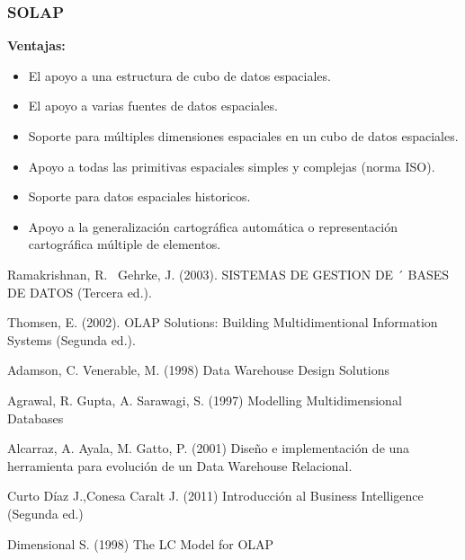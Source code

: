 \documentclass[DIV=calc, paper=a4, fontsize=11pt, twocolumn]{scrartcl}	 %
\begin{document}
\subsubsection{SOLAP}
\textbf{Ventajas:}
\begin{itemize}
\item El apoyo a una estructura de cubo de datos espaciales.
\item El apoyo a varias fuentes de datos espaciales.
\item Soporte para m\'{u}ltiples dimensiones espaciales en un cubo de datos espaciales.
\item Apoyo a todas las primitivas espaciales simples y complejas (norma ISO).
\item Soporte para datos espaciales historicos.
\item Apoyo a la generalizaci\'{o}n cartogr\'{a}fica autom\'{a}tica o representaci\'{o}n cartogr\'{a}fica m\'{u}ltiple de elementos.
\end{itemize}



\begin{thebibliography}{99} %

Ramakrishnan, R.~ Gehrke, J. (2003).
\newblock SISTEMAS DE GESTION DE ´
BASES DE DATOS (Tercera ed.).

Thomsen, E. (2002).
\newblock OLAP Solutions: Building Multidimentional Information Systems (Segunda ed.).


Adamson, C. Venerable, M. (1998)
\newblock Data Warehouse Design Solutions


Agrawal, R. Gupta, A. Sarawagi, S. (1997)
\newblock Modelling Multidimensional Databases

Alcarraz, A. Ayala, M. Gatto, P. (2001)
\newblock Dise\~{n}o e implementación de una herramienta para evolución de un Data Warehouse Relacional.

Curto Díaz J.,Conesa Caralt J. (2011)
\newblock Introducci\'{o}n al Business Intelligence
(Segunda ed.)

Dimensional S. (1998)
\newblock The LC Model for OLAP


\end{thebibliography}

\end{document}
